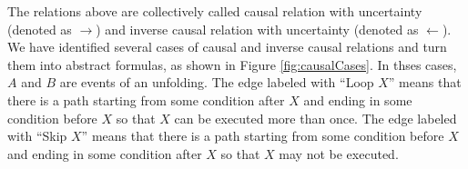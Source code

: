 \documentclass[dvips,...]{llncs}
\begin{document}
The relations above are collectively called causal relation with uncertainty (denoted as $\rightarrow$) and inverse causal relation with uncertainty (denoted as $\leftarrow $). We have identified several cases of causal and inverse causal relations and turn them into abstract formulas, as shown in Figure \ref{fig:causalCases}. In thses cases, $A$ and $B$ are events of an unfolding. The edge labeled with ``Loop $X$'' means that there is a path starting from some condition after $X$ and ending in some condition before $X$ so that $X$ can be executed more than once. The edge labeled with ``Skip $X$'' means that there is a path starting from some condition before $X$ and ending in some condition after $X$ so that $X$ may not be executed. %
\end{document}
